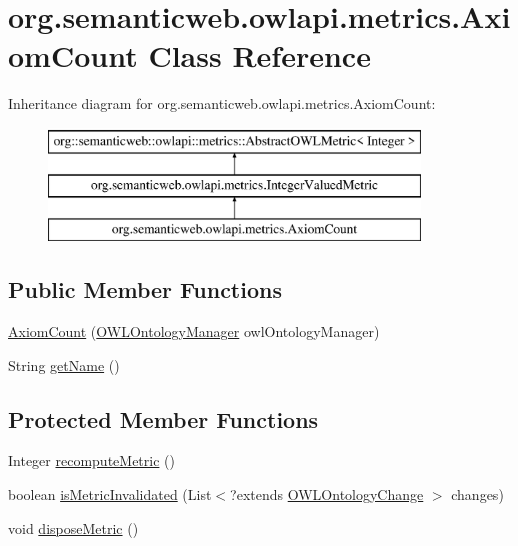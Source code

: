 \hypertarget{classorg_1_1semanticweb_1_1owlapi_1_1metrics_1_1_axiom_count}{\section{org.\-semanticweb.\-owlapi.\-metrics.\-Axiom\-Count Class Reference}
\label{classorg_1_1semanticweb_1_1owlapi_1_1metrics_1_1_axiom_count}
}
Inheritance diagram for org.\-semanticweb.\-owlapi.\-metrics.\-Axiom\-Count\-:\begin{figure}[H]
\begin{center}
\leavevmode
\includegraphics[height=3.000000cm]{classorg_1_1semanticweb_1_1owlapi_1_1metrics_1_1_axiom_count}
\end{center}
\end{figure}
\subsection*{Public Member Functions}
\begin{DoxyCompactItemize}
\item 
\hyperlink{classorg_1_1semanticweb_1_1owlapi_1_1metrics_1_1_axiom_count_a3bd5673fffa305e94253003edf790def}{Axiom\-Count} (\hyperlink{interfaceorg_1_1semanticweb_1_1owlapi_1_1model_1_1_o_w_l_ontology_manager}{O\-W\-L\-Ontology\-Manager} owl\-Ontology\-Manager)
\item 
String \hyperlink{classorg_1_1semanticweb_1_1owlapi_1_1metrics_1_1_axiom_count_abbdce6f28001b00e7545ccd5fb501721}{get\-Name} ()
\end{DoxyCompactItemize}
\subsection*{Protected Member Functions}
\begin{DoxyCompactItemize}
\item 
Integer \hyperlink{classorg_1_1semanticweb_1_1owlapi_1_1metrics_1_1_axiom_count_aaa8f918829b470dce87c7757f60f423a}{recompute\-Metric} ()
\item 
boolean \hyperlink{classorg_1_1semanticweb_1_1owlapi_1_1metrics_1_1_axiom_count_ad8611bb04536f68d1fbd6aa04fe94535}{is\-Metric\-Invalidated} (List$<$?extends \hyperlink{classorg_1_1semanticweb_1_1owlapi_1_1model_1_1_o_w_l_ontology_change}{O\-W\-L\-Ontology\-Change} $>$ changes)
\item 
void \hyperlink{classorg_1_1semanticweb_1_1owlapi_1_1metrics_1_1_axiom_count_abe60f547ae884f4b3817f92d68a5771a}{dispose\-Metric} ()
\end{DoxyCompactItemize}


